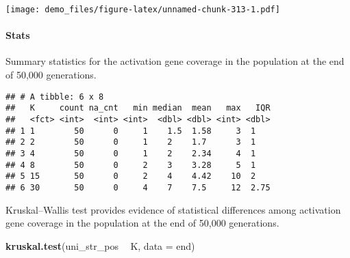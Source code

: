 \documentclass[]{book}
\newenvironment{Shaded}{\begin{snugshade}}{\end{snugshade}}
\newcommand{\DataTypeTok}[1]{\textcolor[rgb]{0.13,0.29,0.53}{#1}}
\newcommand{\KeywordTok}[1]{\textcolor[rgb]{0.13,0.29,0.53}{\textbf{#1}}}
\newcommand{\NormalTok}[1]{#1}
\newcommand{\OperatorTok}[1]{\textcolor[rgb]{0.81,0.36,0.00}{\textbf{#1}}}
\newcommand{\OtherTok}[1]{\textcolor[rgb]{0.56,0.35,0.01}{#1}}
\newcommand{\StringTok}[1]{\textcolor[rgb]{0.31,0.60,0.02}{#1}}
\let\oldparagraph\paragraph
\renewcommand{\paragraph}[1]{\oldparagraph{#1}\mbox{}}
\begin{document}
\texttt{[image: demo\_files/figure-latex/unnamed-chunk-313-1.pdf]}

\hypertarget{stats-60}{%
\paragraph{Stats}\label{stats-60}}

Summary statistics for the activation gene coverage in the population at the end of 50,000 generations.

\begin{Shaded}
\end{Shaded}

\begin{verbatim}
## # A tibble: 6 x 8
##   K     count na_cnt   min median  mean   max   IQR
##   <fct> <int>  <int> <int>  <dbl> <dbl> <int> <dbl>
## 1 1        50      0     1    1.5  1.58     3  1   
## 2 2        50      0     1    2    1.7      3  1   
## 3 4        50      0     1    2    2.34     4  1   
## 4 8        50      0     2    3    3.28     5  1   
## 5 15       50      0     2    4    4.42    10  2   
## 6 30       50      0     4    7    7.5     12  2.75
\end{verbatim}

Kruskal--Wallis test provides evidence of statistical differences among activation gene coverage in the population at the end of 50,000 generations.

\begin{Shaded}
\begin{Highlighting}[]
\KeywordTok{kruskal.test}\NormalTok{(uni_str_pos }\OperatorTok{~}\StringTok{ }\NormalTok{K, }\DataTypeTok{data =}\NormalTok{ end)}
\end{Highlighting}
\end{Shaded}
\end{document}
